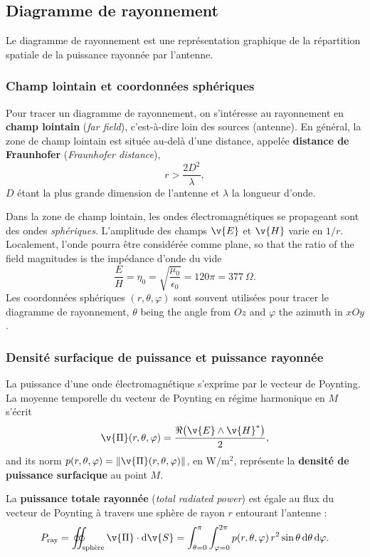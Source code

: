 \subsection{Diagramme de rayonnement}

Le diagramme de rayonnement est une représentation graphique de la répartition
spatiale de la puissance rayonnée par l'antenne.

\subsubsection{Champ lointain et coordonnées sphériques}

\begin{definition}
  Pour tracer un diagramme de rayonnement, on s'intéresse au rayonnement en
  \textbf{champ lointain} (\textit{far field}), c'est-à-dire loin des sources
  (antenne). En général, la zone de champ lointain est située au-delà d'une
  distance, appelée \textbf{distance de Fraunhofer}
  (\textit{Fraunhofer distance}),
  \[ r > \frac{2 D^2}{\lambda}, \]
  $D$ étant la plus grande dimension de l'antenne et $\lambda$ la longueur
  d'onde.
\end{definition}

Dans la zone de champ lointain, les ondes électromagnétiques se propageant sont
des ondes \emph{sphériques}. L'amplitude des champs $\v{E}$ et $\v{H}$ varie en
$1/r$. Localement, l'onde pourra être considérée comme plane, so that the ratio
of the field magnitudes is the impédance d'onde du vide
\[ \frac{E}{H} = \eta_0 = \sqrt{\frac{\mu_0}{\epsilon_0}} = 120\pi = 377\ \Omega. \]
Les coordonnées sphériques $(r, \theta, \varphi)$ sont souvent utilisées pour
tracer le diagramme de rayonnement, $\theta$ being the angle from $Oz$ and
$\varphi$ the azimuth in $xOy$.

\subsubsection{Densité surfacique de puissance et puissance rayonnée}

La puissance d'une onde électromagnétique s'exprime par le vecteur de Poynting.
La moyenne temporelle du vecteur de Poynting en régime harmonique en $M$
s'écrit
\[ \v{\Pi}(r,\theta,\varphi) = \frac{\Re\bigl(\v{E} \wedge \v{H}^{*}\bigr)}{2}, \]
and its norm $p(r,\theta,\varphi) = \|\v{\Pi}(r,\theta,\varphi)\|$, en
W$/$m$^2$, représente la \textbf{densité de puissance surfacique} au point
$M$.

\begin{definition}
  La \textbf{puissance totale rayonnée} (\textit{total radiated power}) est
  égale au flux du vecteur de Poynting à travers une sphère de rayon $r$
  entourant l'antenne :
  \[ P_{\mathrm{ray}} = \oint\!\!\!\!\oint_{\text{sphère}} \v{\Pi} \cdot \mathrm{d}\v{S}
     = \int_{\theta=0}^{\pi} \int_{\varphi=0}^{2\pi}
       p(r,\theta,\varphi)\, r^2 \sin\theta \,\mathrm{d}\theta\, \mathrm{d}\varphi. \]
\end{definition}

